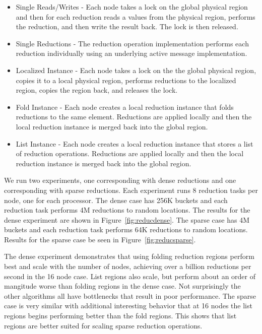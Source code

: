 \begin{itemize} \itemsep1pt \parskip0pt 
\item Single Reads/Writes - Each node takes a lock on the global physical region and then for each reduction
reads a values from the physical region, performs the reduction, and then write the result back.  The lock is then released.
\item Single Reductions - The reduction operation implementation performs each reduction individually
using an underlying active message implementation.
\item Localized Instance - Each node takes a lock on the the global physical region, copies it to a local physical
region, performs reductions to the localized region, copies the region back, and releases the lock.
\item Fold Instance - Each node creates a local reduction instance that folds reductions to the same element.
Reductions are applied locally and then the local reduction instance is merged back into the global region.
\item List Instance - Each node creates a local reduction instance that stores a list of reduction operations.
Reductions are applied locally and then the local reduction instance is merged back into the global region.
\end{itemize}

We run two experiments, one corresponding with dense reductions and one corresponding with sparse
reductions.  Each experiment runs 8 reduction tasks per node, one for each processor.  The dense
case has 256K buckets and each reduction task performs 4M reductions to random locations.  The results for the
dense experiment are shown in Figure~\ref{fig:reducdense}.  The sparse case has 4M buckets and
each reduction task performs 64K reductions to random locations.  Results for the sparse case
be seen in Figure~\ref{fig:reducsparse}.

The dense experiment demonstrates that using folding reduction regions perform 
best and scale with the number of nodes, achieving over a billion reductions
per second in the 16 node case.  List regions also scale, but perform about an
order of mangitude worse than folding regions in the dense case.  Not surprisingly
the other algorithms all have bottlenecks that result in poor performance.  The
sparse case is very similar with additional interesting behavior that at 16 nodes
the list regions begins performing better than the fold regions.  This shows that
list regions are better suited for scaling sparse reduction operations.

